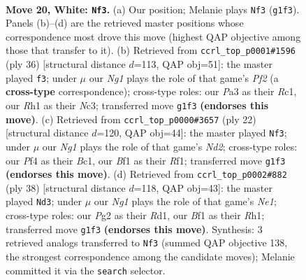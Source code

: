 \documentclass[11pt]{article}
\begin{document}
\clearpage

\begin{figure}[p]\centering
\begin{subfigure}{0.46\textwidth}\centering
\resizebox{\linewidth}{!}{%
\newchessgame
\chessboard[
  setfen={rnb1r3/2pnqkpp/1p2p3/p2pPp2/3P1P1P/P5Q1/1PPKN1P1/1R3BNR w - - 1 20},
  showmover=false,
  pgfstyle=straightmove, color=movearrow, markmove={g1-f3}
]}
\caption{}
\end{subfigure}\hfill
\begin{subfigure}{0.46\textwidth}\centering
\resizebox{\linewidth}{!}{%
\newchessgame
\chessboard[
  setfen={r2r2k1/1q1n1pp1/pp1ppn1p/8/2PNP3/1PNR2P1/P3QPKP/2R5 w - - 4 19},
  showmover=false,
  pgfstyle=straightmove, color=movearrow, markmove={f2-f3}
]}
\caption{}
\end{subfigure}
\\[4pt]
\begin{subfigure}{0.46\textwidth}\centering
\resizebox{\linewidth}{!}{%
\newchessgame
\chessboard[
  setfen={r2qkb1r/pp1n1pp1/2p1p3/3pPn1p/3P4/2PN4/PP1N1PPP/R1BQ1RK1 w kq - 1 12},
  showmover=false,
  pgfstyle=straightmove, color=movearrow, markmove={d2-f3}
]}
\caption{}
\end{subfigure}\hfill
\begin{subfigure}{0.46\textwidth}\centering
\resizebox{\linewidth}{!}{%
\newchessgame
\chessboard[
  setfen={r4r2/1ppb2k1/nn1p1qpp/p2P4/2P1Pp1P/1PN5/P2Q1PB1/1K1RN2R w - - 1 20},
  showmover=false,
  pgfstyle=straightmove, color=movearrow, markmove={e1-d3}
]}
\caption{}
\end{subfigure}
\caption{\textbf{Move 20, White: \texttt{Nf3}.} (a) Our position; Melanie plays \texttt{Nf3} (\texttt{g1f3}). Panels (b)--(d) are the retrieved master positions whose correspondence most drove this move (highest QAP objective among those that transfer to it). (b) Retrieved from \texttt{ccrl\_top\_p0001\#1596} (ply 36) [structural distance $d$=113, QAP obj=51]: the master played \texttt{f3}; under $\mu$ our \emph{Ng1} plays the role of that game's \emph{Pf2} (a \textbf{cross-type} correspondence); cross-type roles: our \emph{P}a3 as their \emph{R}c1, our \emph{R}h1 as their \emph{N}c3; transferred move \texttt{g1f3} \textbf{(endorses this move)}. (c) Retrieved from \texttt{ccrl\_top\_p0000\#3657} (ply 22) [structural distance $d$=120, QAP obj=44]: the master played \texttt{Nf3}; under $\mu$ our \emph{Ng1} plays the role of that game's \emph{Nd2}; cross-type roles: our \emph{P}f4 as their \emph{B}c1, our \emph{B}f1 as their \emph{R}f1; transferred move \texttt{g1f3} \textbf{(endorses this move)}. (d) Retrieved from \texttt{ccrl\_top\_p0002\#882} (ply 38) [structural distance $d$=118, QAP obj=43]: the master played \texttt{Nd3}; under $\mu$ our \emph{Ng1} plays the role of that game's \emph{Ne1}; cross-type roles: our \emph{P}g2 as their \emph{R}d1, our \emph{B}f1 as their \emph{R}h1; transferred move \texttt{g1f3} \textbf{(endorses this move)}. Synthesis: 3 retrieved analogs transferred to \texttt{Nf3} (summed QAP objective 138, the strongest correspondence among the candidate moves); Melanie committed it via the \texttt{search} selector.}
\label{fig:thought-m38}
\end{figure}
\end{document}
